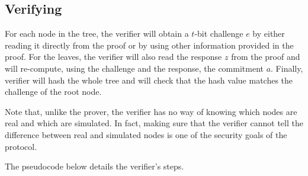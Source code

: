 \documentclass[11pt]{article}
\begin{document}
\subsection{Verifying}
\label{sec:verifying}


For each node in the tree, the verifier will obtain a $t$-bit challenge $e$ by either reading it directly from the proof or by using other information provided in the proof. For the leaves, the verifier will also read the response $z$ from the proof and will re-compute, using the challenge and the response, the commitment $a$.  Finally, verifier will hash the whole tree and will check that the hash value matches the challenge of the root node.

Note that, unlike the prover, the verifier has no way of knowing which nodes are real and which are simulated. In fact, making sure that the verifier cannot tell the difference between real and simulated nodes is one of the security goals of the protocol.

The pseudocode below details the verifier's steps.
\end{document}
